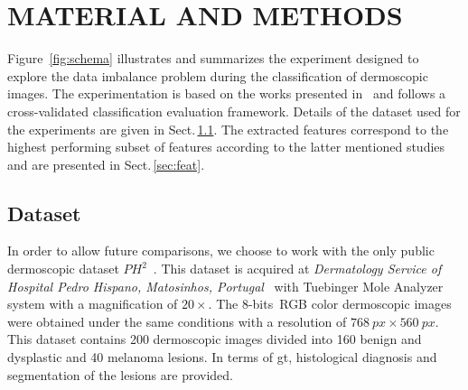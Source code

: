 \graphicspath{ {./content/method/figures/} }

\section{\uppercase{Material and Methods}}\label{sec:mm}


\noindent Figure~\ref{fig:schema} illustrates and summarizes the experiment designed to explore the data imbalance problem during the classification of dermoscopic images.
The experimentation is based on the works presented in~\cite{rastgoo2015automatic, rastgoo2015ensemble} and follows a cross-validated classification evaluation framework.
Details of the dataset used for the experiments are given in Sect.\,\ref{sec:dataset}. 
The extracted features correspond to the highest performing subset of features according to the latter mentioned studies and are presented in Sect.\,\ref{sec:feat}.

\subsection{Dataset}\label{sec:dataset}
In order to allow future comparisons, we choose to work with the only public dermoscopic dataset $PH^{2}$~\cite{barata2013two}.
This dataset is acquired at \textit{Dermatology Service of Hospital Pedro Hispano, Matosinhos, Portugal}~\cite{barata2013two} with Tuebinger Mole Analyzer system with a magnification of $20 \times$.
The 8-bits~RGB color dermoscopic images were obtained under the same conditions with a resolution of $\SI{768}{px} \times \SI{560}{px}$. 
This dataset contains 200 dermoscopic images divided into 160 benign and dysplastic and 40 melanoma lesions. 
In terms of \acf{gt}, histological diagnosis and segmentation of the lesions are provided. 

